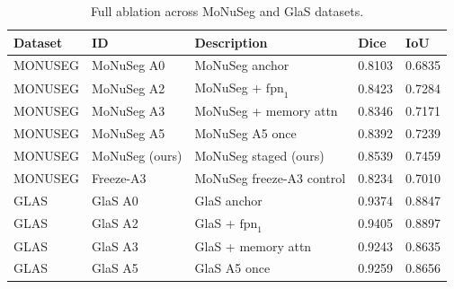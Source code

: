 \begin{table}[htbp]
  \centering
  \small
  \begin{tabular}{lllll}
  \toprule
  \textbf{Dataset} & \textbf{ID} & \textbf{Description} & \textbf{Dice} & \textbf{IoU} \\
  \midrule
  MONUSEG & MoNuSeg A0 & MoNuSeg anchor & 0.8103 & 0.6835 \\
  MONUSEG & MoNuSeg A2 & MoNuSeg + $\text{fpn}_1$ & 0.8423 & 0.7284 \\
  MONUSEG & MoNuSeg A3 & MoNuSeg + memory attn & 0.8346 & 0.7171 \\
  MONUSEG & MoNuSeg A5 & MoNuSeg A5 once & 0.8392 & 0.7239 \\
  MONUSEG & MoNuSeg (ours) & MoNuSeg staged (ours) & 0.8539 & 0.7459 \\
  MONUSEG & Freeze-A3 & MoNuSeg freeze-A3 control & 0.8234 & 0.7010 \\
  GLAS & GlaS A0 & GlaS anchor & 0.9374 & 0.8847 \\
  GLAS & GlaS A2 & GlaS + $\text{fpn}_1$ & 0.9405 & 0.8897 \\
  GLAS & GlaS A3 & GlaS + memory attn & 0.9243 & 0.8635 \\
  GLAS & GlaS A5 & GlaS A5 once & 0.9259 & 0.8656 \\
  \bottomrule
  \end{tabular}
  \caption{Full ablation across MoNuSeg and GlaS datasets.}
  \label{tab:appendix_ablation}
\end{table}
